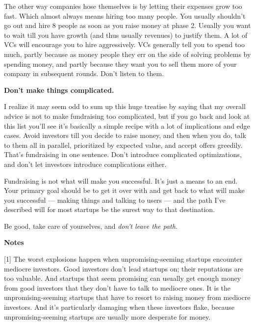 The other way
                    companies hose themselves is by letting their expenses grow
                    too fast. Which almost always means hiring too many people.
                    You usually shouldn't go out and hire 8 people as soon as
                    you raise money at phase 2. Usually you want to wait till
                    you have growth (and thus usually revenues) to justify them.
                    A lot of VCs will encourage you to hire aggressively. VCs
                    generally tell you to spend too much, partly because as
                    money people they err on the side of solving problems by
                    spending money, and partly because they want you to sell
                    them more of your company in subsequent rounds. Don't listen
                    to them.


                    \textbf{Don't make things complicated.}

I realize
                    it may seem odd to sum up this huge treatise by saying that
                    my overall advice is not to make fundraising too
                    complicated, but if you go back and look at this list you'll
                    see it's basically a simple recipe with a lot of
                    implications and edge cases. Avoid investors till you decide
                    to raise money, and then when you do, talk to them all in
                    parallel, prioritized by expected value, and accept offers
                    greedily. That's fundraising in one sentence. Don't
                    introduce complicated optimizations, and don't let investors
                    introduce complications either.

Fundraising is
                    not what will make you successful. It's just a means to an
                    end. Your primary goal should be to get it over with and get
                    back to what will make you successful --- making things
                    and talking to users --- and the path I've described
                    will for most startups be the surest way to that
                    destination.

Be good, take care of yourselves,
                    and
                    \emph{don't leave the path}.






                    \textbf{Notes}

[1] The worst explosions happen when unpromising-seeming
                    startups encounter mediocre investors. Good investors don't
                    lead startups on; their reputations are too valuable. And
                    startups that seem promising can usually get enough money
                    from good investors that they don't have to talk to mediocre
                    ones. It is the unpromising-seeming startups that have to
                    resort to raising money from mediocre investors. And it's
                    particularly damaging when these investors flake, because
                    unpromising-seeming startups are usually more desperate for
                    money.

